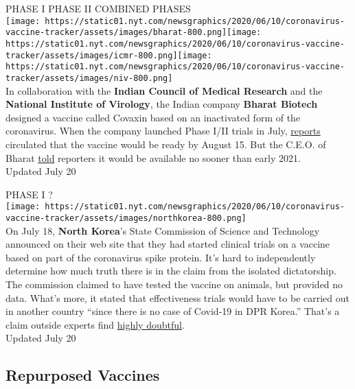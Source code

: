 PHASE I PHASE II COMBINED PHASES\\
\texttt{[image: https://static01.nyt.com/newsgraphics/2020/06/10/coronavirus-vaccine-tracker/assets/images/bharat-800.png]}\texttt{[image: https://static01.nyt.com/newsgraphics/2020/06/10/coronavirus-vaccine-tracker/assets/images/icmr-800.png]}\texttt{[image: https://static01.nyt.com/newsgraphics/2020/06/10/coronavirus-vaccine-tracker/assets/images/niv-800.png]}\\
In collaboration with the \textbf{Indian Council of Medical Research}
and the \textbf{National Institute of Virology}, the Indian company
\textbf{Bharat Biotech} designed a vaccine called Covaxin based on an
inactivated form of the coronavirus. When the company launched Phase
I/II trials in July,
\href{https://uk.reuters.com/article/uk-health-coronavirus-india-bharat-biote/health-experts-cast-doubt-on-indias-timeline-for-covid-vaccine-idUKKBN2440XD}{reports}
circulated that the vaccine would be ready by August 15. But the C.E.O.
of Bharat
\href{https://www.newindianexpress.com/nation/2020/jul/03/interview--covaxin-by-2021-if-all-goes-well-bharat-biotech-chairman-2164708.html}{told}
reporters it would be available no sooner than early 2021.\\
Updated July 20

PHASE I ?\\
\texttt{[image: https://static01.nyt.com/newsgraphics/2020/06/10/coronavirus-vaccine-tracker/assets/images/northkorea-800.png]}\\
On July 18, \textbf{North Korea}'s State Commission of Science and
Technology announced on their web site that they had started clinical
trials on a vaccine based on part of the coronavirus spike protein. It's
hard to independently determine how much truth there is in the claim
from the isolated dictatorship. The commission claimed to have tested
the vaccine on animals, but provided no data. What's more, it stated
that effectiveness trials would have to be carried out in another
country ``since there is no case of Covid-19 in DPR Korea.'' That's a
claim outside experts find
\href{https://www.nytimes.com/2020/03/31/world/asia/north-korea-coronavirus.html}{highly
doubtful}.\\
Updated July 20

\hypertarget{repurposed-vaccines}{%
\subsection{\texorpdfstring{\textbf{Repurposed
Vaccines}}{Repurposed Vaccines}}\label{repurposed-vaccines}}

